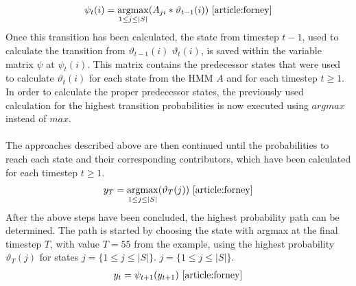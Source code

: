 \documentclass[12pt,journal,compsoc]{IEEEtran}
\newcommand{\argmax}{\operatornamewithlimits{argmax}}
\begin{document}
\begin{align*}
	\displaystyle \psi_{t}(i)=\argmax_{1\leq j\leq\mid S\mid}(A_{ji}*\vartheta_{t-1}(i)) \text{ \cite{article:forney}}
\end{align*}
Once this transition has been calculated, the state from timestep $t - 1$, used to calculate the transition from $\vartheta_{t-1}(i)$ $\vartheta_{t}(i)$, is saved within the variable matrix $\psi$ at $\psi_{t}(i)$. This matrix contains the predecessor states that were used to calculate $\vartheta_{t}(i)$ for each state from the HMM $A$ and for each timestep $t \geq 1$. In order to calculate the proper predecessor states, the previously used calculation for the highest transition probabilities is now executed using $argmax$ instead of $max$.\\
\\
The approaches described above are then continued until the probabilities to reach each state and their corresponding contributors, which have been calculated for each timestep $t \geq 1$.
\begin{align*}
	\displaystyle y_{T}=\argmax_{1\leq j\leq\mid S\mid}(\vartheta_{T}(j)) \text{ \cite{article:forney}}
\end{align*}
After the above steps have been concluded, the highest probability path can be determined. The path is started by choosing the state with argmax at the final timestep $T$, with value $T=55$ from the example, using the highest probability $\vartheta_{T}(j)$ for states $j=\{1\leq j\leq\mid S\mid\}$.
$j=\{1\leq j\leq\mid S\mid\}$.
\begin{align*}
	\displaystyle y_{t}=\psi_{t+1}(y_{t+1}) \text{ \cite{article:forney}}
\end{align*}
\end{document}
